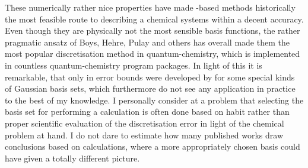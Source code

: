 These numerically rather nice properties
have made \cGTO-based methods
historically the most feasible route
to describing a chemical systems within a decent accuracy.
Even though they are physically not the most sensible basis functions,
the rather pragmatic ansatz of Boys, Hehre, Pulay and others
has overall made them the most popular discretisation method in quantum-chemistry,
which is implemented in countless quantum-chemistry program packages.
In light of this it is remarkable,
that only in \citeyear{Bachmayr2014}
error bounds were developed by \citet{Bachmayr2014} for some special
kinds of Gaussian basis sets,
which furthermore do not see any application in practice
to the best of my knowledge.
I personally consider at a problem
that selecting the \cGTO basis set for performing a calculation is often done
based on habit rather than proper scientific evaluation
of the discretisation error in light of the chemical problem at hand.
I do not dare to estimate how many published works
draw conclusions based on calculations,
where a more appropriately chosen basis
could have given a totally different picture.
